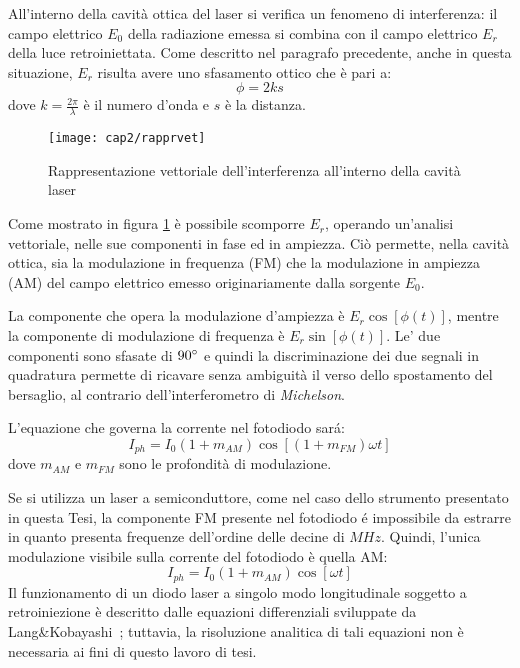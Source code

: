 All'interno della cavità ottica del laser si verifica un fenomeno di interferenza: il campo elettrico $E_0$ della radiazione emessa si combina con il campo elettrico $E_r$ della luce retroiniettata. Come descritto nel paragrafo precedente, anche in questa situazione, $E_r$ risulta avere uno sfasamento ottico che è pari a:
\begin{equation}
	\phi=2ks
\end{equation}
dove $k=\frac{2\pi}{\lambda}$ è il numero d'onda e $s$ è la distanza.
\begin{figure}  
  \begin{center}
    \texttt{[image: cap2/rapprvet]}
    \caption{Rappresentazione vettoriale dell'interferenza all'interno della cavità laser}
    \label{rapprvet}
  \end{center}
\end{figure}
Come mostrato in figura \ref{rapprvet} è possibile scomporre $E_r$, operando un'analisi vettoriale, nelle sue componenti in fase ed in ampiezza. Ciò permette, nella cavità ottica, sia la modulazione in frequenza (FM) che la modulazione in ampiezza (AM) del campo elettrico emesso originariamente dalla sorgente $E_0$. 

La componente che opera la modulazione d'ampiezza è $E_r\cos[\phi(t)]$, mentre la componente di modulazione di frequenza è $E_r\sin[\phi(t)]$. Le' due componenti sono sfasate di $90\degree$ e quindi la discriminazione dei due segnali in quadratura permette di ricavare senza ambiguità il verso dello spostamento del bersaglio, al contrario dell'interferometro di \textit{Michelson}.

L'equazione che governa la corrente nel fotodiodo sará:
\begin{equation}
	I_{ph}=I_0(1+m_{AM})\cos{[(1+m_{FM})\omega t]}
\end{equation}
dove $m_{AM}$ e $m_{FM}$ sono le profondità di modulazione.

Se si utilizza un laser a semiconduttore, come nel caso dello strumento presentato in questa Tesi, la componente FM presente nel fotodiodo é impossibile da estrarre in quanto presenta frequenze dell'ordine delle decine di $MHz$. Quindi, l'unica modulazione visibile sulla corrente del fotodiodo è quella AM:
\begin{equation}
	I_{ph}=I_0(1+m_{AM})\cos{[\omega t]}
\end{equation}
Il funzionamento di un diodo laser a singolo modo longitudinale soggetto a retroiniezione è descritto dalle equazioni differenziali sviluppate da Lang\&Kobayashi~\cite{1070479}; tuttavia, la risoluzione analitica di tali equazioni non è necessaria ai fini di questo lavoro di tesi.


